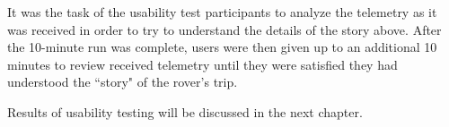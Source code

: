 It was the task of the usability test participants to analyze the telemetry as it was received in order to try to understand the details of the story above. After the 10-minute run was complete, users were then given up to an additional 10 minutes to review received telemetry until they were satisfied they had understood the ``story" of the rover's trip.

Results of usability testing will be discussed in the next chapter.
